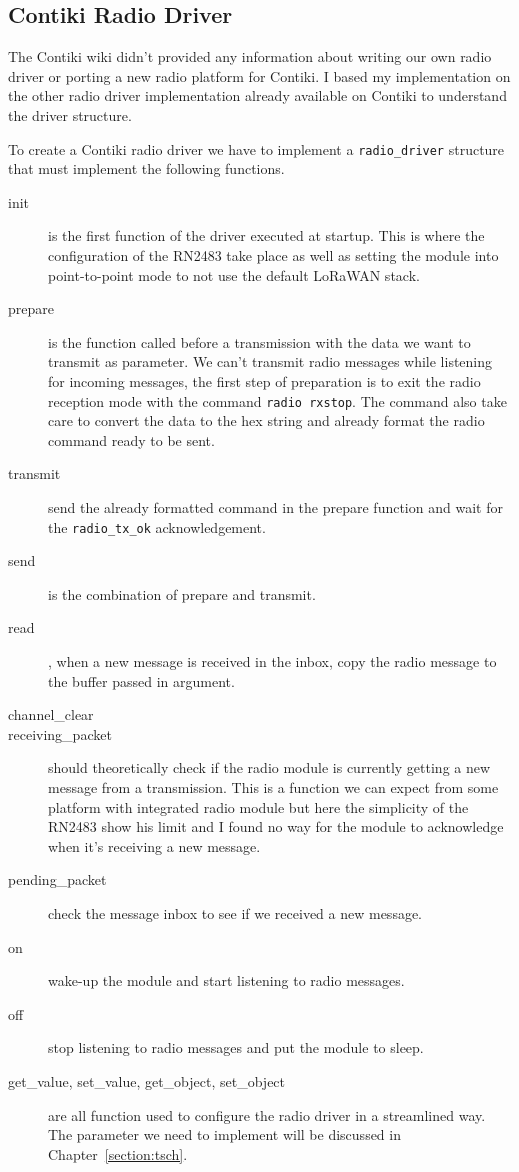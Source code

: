 \subsection{Contiki Radio Driver}

The Contiki wiki didn't provided any information about writing our own radio driver
or porting a new radio platform for Contiki.
I based my implementation on the other radio driver implementation already
available on Contiki to understand the driver structure.

To create a Contiki radio driver we have to implement a \lstinline{radio_driver}
structure that must implement the following functions.

\begin{description}
  \item[init] is the first function of the driver executed at startup.
    This is where the configuration of the RN2483 take place
    as well as setting the module into point-to-point mode to not use the default
    LoRaWAN stack.
  \item[prepare] is the function called before a transmission with the data we
    want to transmit as parameter. 
    We can't transmit radio messages while listening for incoming messages, the
    first step of preparation is to exit the radio reception mode with the
    command \lstinline{radio rxstop}.
    The command also take care to convert the data to the hex string and
    already format the radio command ready to be sent.
  \item[transmit] send the already formatted command in the prepare function and
    wait for the \lstinline{radio_tx_ok} acknowledgement.
  \item[send] is the combination of prepare and transmit.
  \item[read], when a new message is received in the inbox, copy the radio
    message to the buffer passed in argument.
  \item[channel\_clear]
  \item[receiving\_packet] should theoretically check if the radio module is
    currently getting a new message from a transmission. This is a function we
    can expect from some platform with integrated radio module but here the
    simplicity of the RN2483 show his limit and I found no way for the module
    to acknowledge when it's receiving a new message.
  \item[pending\_packet] check the message inbox to see if we received a new
    message.
  \item[on] wake-up the module and start listening to radio messages.
  \item[off] stop listening to radio messages and put the module to sleep.
  \item[get\_value, set\_value, get\_object, set\_object] are all function used
    to configure the radio driver in a streamlined way. The parameter we need to
    implement will be discussed in Chapter~\ref{section:tsch}.
\end{description}

